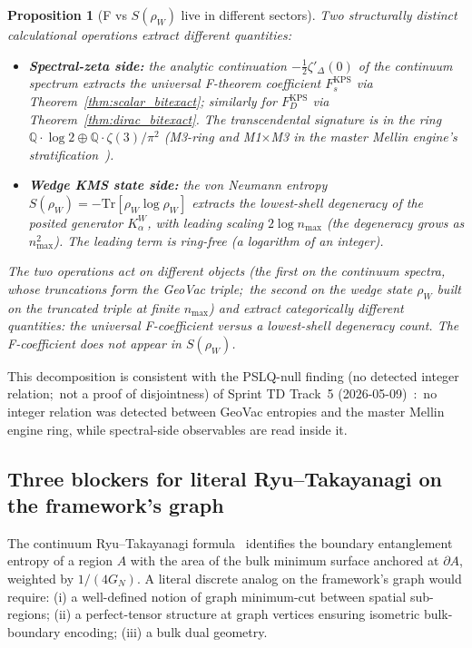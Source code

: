 \documentclass[11pt,a4paper]{article}
\theoremstyle{plain}
\newtheorem{proposition}[theorem]{Proposition}
\theoremstyle{definition}
\newcommand{\nmax}{n_{\max}}
\newcommand{\Q}{\mathbb{Q}}
\newcommand{\Tr}{\mathrm{Tr}}
\newcommand{\Kalpha}{K_{\alpha}^{W}}
\newcommand{\rhoW}{\rho_{W}}
\newcommand{\KPS}{\text{KPS}}
\begin{document}
\begin{proposition}[F vs $S(\rhoW)$ live in different sectors]
\label{prop:F_vs_S_decomposition}
Two structurally distinct calculational operations extract different
quantities:

\begin{itemize}
\item \textbf{Spectral-zeta side:} the analytic continuation
$-\tfrac{1}{2} \zeta'_{\Delta}(0)$ of the continuum spectrum extracts the universal F-theorem
coefficient $F_{s}^{\KPS}$ via Theorem~\ref{thm:scalar_bitexact};
similarly for $F_{D}^{\KPS}$ via Theorem~\ref{thm:dirac_bitexact}.
The transcendental signature is in the ring
$\Q \cdot \log 2 \oplus \Q \cdot \zeta(3)/\pi^{2}$ (M3-ring and
M1$\times$M3 in the master Mellin engine's stratification~\cite{paper18}).

\item \textbf{Wedge KMS state side:} the von Neumann entropy
$S(\rhoW) = -\Tr[\rhoW \log \rhoW]$ extracts the lowest-shell
degeneracy of the posited generator $\Kalpha$, with leading scaling
$2 \log \nmax$ (the degeneracy grows as $\nmax^{2}$). The leading term
is ring-free (a logarithm of an integer).
\end{itemize}

The two operations act on different objects (the first on the
continuum spectra, whose truncations form the GeoVac triple;\ the second
on the wedge state $\rhoW$ built on the truncated triple at finite
$\nmax$) and extract \emph{categorically different} quantities: the universal
F-coefficient versus a lowest-shell degeneracy count. The F-coefficient
does \emph{not} appear in $S(\rhoW)$.
\end{proposition}

This decomposition is consistent with the PSLQ-null finding (no
detected integer relation;\ not a proof of disjointness)
of Sprint TD Track~5 (2026-05-09)~\cite{debug:sprint_td_track5}:\
no integer relation was detected between GeoVac entropies and the
master Mellin engine ring, while spectral-side observables are read
inside it.

\subsection{Three blockers for literal Ryu--Takayanagi on the framework's graph}

The continuum Ryu--Takayanagi formula~\cite{ryu_takayanagi2006}
identifies the boundary entanglement entropy of a region $A$ with
the area of the bulk minimum surface anchored at $\partial A$,
weighted by $1/(4 G_{N})$. A literal discrete analog on the
framework's graph would require: (i) a well-defined notion of
graph minimum-cut between spatial sub-regions; (ii) a perfect-tensor
structure at graph vertices ensuring isometric bulk-boundary
encoding; (iii) a bulk dual geometry.
\end{document}
